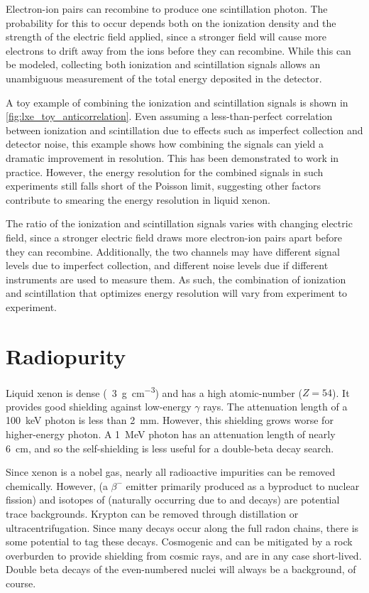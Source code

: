 \documentclass[herrin-thesis.tex]{subfiles}
\begin{document}
Electron-ion pairs can recombine to produce one scintillation photon. The probability for this to occur depends both on the ionization density and the strength of the electric field applied, since a stronger field will cause more electrons to drift away from the ions before they can recombine. While this can be modeled\cite{Doke:1988qf}\cite{Thomas:1987ve}, collecting both ionization and scintillation signals allows an unambiguous measurement of the total energy deposited in the detector.

A toy example of combining the ionization and scintillation signals is shown in \cref{fig:lxe_toy_anticorrelation}. Even assuming a less-than-perfect correlation between ionization and scintillation due to effects such as imperfect collection and detector noise, this example shows how combining the signals can yield a dramatic improvement in resolution. This has been demonstrated to work in practice\cite{Conti:2003tg}\cite{Aprile:2007hc}. However, the energy resolution for the combined signals in such experiments still falls short of the Poisson limit, suggesting other factors contribute to smearing the energy resolution in liquid xenon.

The ratio of the ionization and scintillation signals varies with changing electric field, since a stronger electric field draws more electron-ion pairs apart before they can recombine. Additionally, the two channels may have different signal levels due to imperfect collection, and different noise levels due if different instruments are used to measure them. As such, the combination of ionization and scintillation that optimizes energy resolution will vary from experiment to experiment.

\section{Radiopurity}
Liquid xenon is dense (\about~\SI{3}{\g\per\cubic\cm}) and has a high atomic-number (\(Z=54\)). It provides good shielding against low-energy \(\gamma\) rays. The attenuation length of a \SI{100}{keV} photon is less than \SI{2}{\mm}\cite{Berger:2010dq}. However, this shielding grows worse for higher-energy photon. A \SI{1}{MeV} photon has an attenuation length of nearly \SI{6}{\cm}, and so the self-shielding is less useful for a double-beta decay search.

Since xenon is a nobel gas, nearly all radioactive impurities can be removed chemically. However,  (a \(\beta^{-}\) emitter primarily produced as a byproduct to nuclear fission) and isotopes of  (naturally occurring due to  and  decays) are potential trace backgrounds. Krypton can be removed through distillation or ultracentrifugation. Since many decays occur along the full radon chains, there is some potential to tag these decays. Cosmogenic  and  can be mitigated by a rock overburden to provide shielding from cosmic rays, and are in any case short-lived. Double beta decays of the even-numbered nuclei will always be a background, of course.
\end{document}
